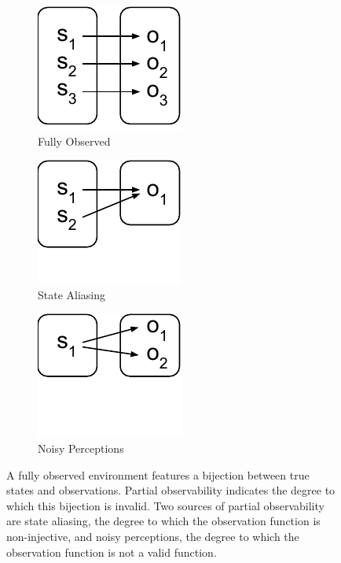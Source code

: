 \documentclass{article} %
\theoremstyle{definition}
\begin{document}
\begin{figure}[htp]
\centering
\begin{subfigure}{.3\textwidth}
  \centering
  \includegraphics[width=.6\linewidth]{figures/bijection}
  \caption{Fully Observed}
  \label{fig:bijection}
\end{subfigure}
\begin{subfigure}{.3\textwidth}
  \centering
  \includegraphics[width=.6\linewidth]{figures/state-aliasing}
  \caption{State Aliasing}
  \label{fig:state-aliasing}
\end{subfigure}
\begin{subfigure}{.3\textwidth}
  \centering
  \includegraphics[width=.6\linewidth]{figures/noisy-perception}
  \caption{Noisy Perceptions}
  \label{fig:noisy-perception}
\end{subfigure}
\caption{A fully observed environment features a bijection between
  true states and observations. Partial observability indicates the
  degree to which this bijection is invalid. Two sources of partial
  observability are state aliasing, the degree to which the
  observation function is non-injective, and noisy perceptions, the
  degree to which the observation function is not a valid function.}
\label{fig:functions}
\end{figure}
\end{document}
